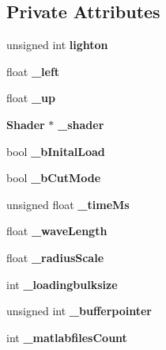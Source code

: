 \subsection*{Private Attributes}
\begin{DoxyCompactItemize}
\item 
unsigned int {\bfseries lighton}\label{classSoundfieldViewer_1_1MatlabFieldViewer_a126ca6f34b6d705810d5522a78b17831}

\item 
float {\bfseries \-\_\-left}\label{classSoundfieldViewer_1_1MatlabFieldViewer_a3616335929d190d8b529e8b66b4bd560}

\item 
float {\bfseries \-\_\-up}\label{classSoundfieldViewer_1_1MatlabFieldViewer_aaec43c216180edae5de24c077a147ffb}

\item 
{\bf Shader} $\ast$ {\bfseries \-\_\-shader}\label{classSoundfieldViewer_1_1MatlabFieldViewer_a84776380a5358f2e473d3ed9913c5dca}

\item 
bool {\bfseries \-\_\-b\-Inital\-Load}\label{classSoundfieldViewer_1_1MatlabFieldViewer_ad0cbbbaf0207d5a03145544aba175e79}

\item 
bool {\bfseries \-\_\-b\-Cut\-Mode}\label{classSoundfieldViewer_1_1MatlabFieldViewer_a2991ebf76b6338e406de4bc6007f7afe}

\item 
unsigned float {\bfseries \-\_\-time\-Ms}\label{classSoundfieldViewer_1_1MatlabFieldViewer_a3442fa99b45e321331aeee59aa3d60a7}

\item 
float {\bfseries \-\_\-wave\-Length}\label{classSoundfieldViewer_1_1MatlabFieldViewer_a1f0138e468646b4dbf8e356c91176254}

\item 
float {\bfseries \-\_\-radius\-Scale}\label{classSoundfieldViewer_1_1MatlabFieldViewer_a0218dd513bd1f428be34c944a25d52d5}

\item 
int {\bfseries \-\_\-loadingbulksize}\label{classSoundfieldViewer_1_1MatlabFieldViewer_a5c7cc56e8d49290e1f53ae10a0fdccaf}

\item 
unsigned int {\bfseries \-\_\-bufferpointer}\label{classSoundfieldViewer_1_1MatlabFieldViewer_aeb63f988c5238b61700d4081af5f4109}

\item 
int {\bfseries \-\_\-matlabfiles\-Count}\label{classSoundfieldViewer_1_1MatlabFieldViewer_a28f0c9a9f01dd8fe40ddabc6fab5b94c}

\end{DoxyCompactItemize}
